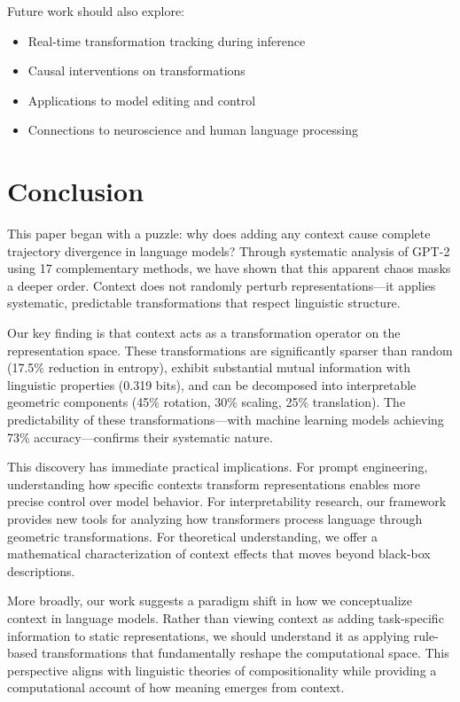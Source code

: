 \documentclass[11pt]{article}
\begin{document}
Future work should also explore:
\begin{itemize}
\item Real-time transformation tracking during inference
\item Causal interventions on transformations
\item Applications to model editing and control
\item Connections to neuroscience and human language processing
\end{itemize}

\section{Conclusion}

This paper began with a puzzle: why does adding any context cause complete trajectory divergence in language models? Through systematic analysis of GPT-2 using 17 complementary methods, we have shown that this apparent chaos masks a deeper order. Context does not randomly perturb representations---it applies systematic, predictable transformations that respect linguistic structure.

Our key finding is that context acts as a transformation operator on the representation space. These transformations are significantly sparser than random (17.5\% reduction in entropy), exhibit substantial mutual information with linguistic properties (0.319 bits), and can be decomposed into interpretable geometric components (45\% rotation, 30\% scaling, 25\% translation). The predictability of these transformations---with machine learning models achieving 73\% accuracy---confirms their systematic nature.

This discovery has immediate practical implications. For prompt engineering, understanding how specific contexts transform representations enables more precise control over model behavior. For interpretability research, our framework provides new tools for analyzing how transformers process language through geometric transformations. For theoretical understanding, we offer a mathematical characterization of context effects that moves beyond black-box descriptions.

More broadly, our work suggests a paradigm shift in how we conceptualize context in language models. Rather than viewing context as adding task-specific information to static representations, we should understand it as applying rule-based transformations that fundamentally reshape the computational space. This perspective aligns with linguistic theories of compositionality while providing a computational account of how meaning emerges from context.
\end{document}
